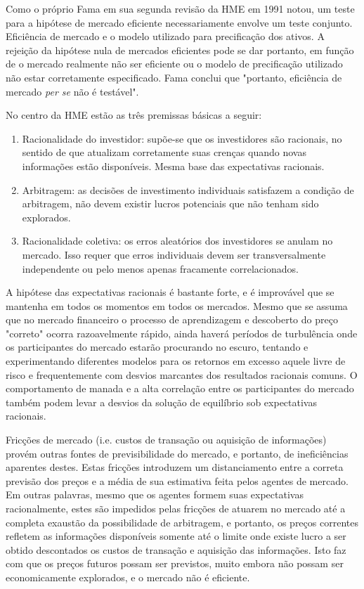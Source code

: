Como o próprio Fama em sua segunda revisão da HME em 1991 notou, um teste para a hipótese de mercado eficiente necessariamente envolve um teste conjunto. Eficiência de mercado e o modelo utilizado para precificação dos ativos. A rejeição da hipótese nula de mercados eficientes pode se dar portanto, em função de o mercado realmente não ser eficiente ou o modelo de precificação utilizado não estar corretamente especificado. Fama conclui que "portanto, eficiência de mercado \emph{per se} não é testável".

No centro da HME estão as três premissas básicas a seguir:

\begin{enumerate}
	\item Racionalidade do investidor: supõe-se que os investidores são racionais, no sentido de que atualizam corretamente suas crenças quando novas informações estão disponíveis. Mesma base das expectativas racionais.
	\item Arbitragem: as decisões de investimento individuais satisfazem a condição de arbitragem, não devem existir lucros potenciais que não tenham sido explorados.
	\item Racionalidade coletiva: os erros aleatórios dos investidores se anulam no mercado. Isso requer que erros individuais devem ser transversalmente independente ou pelo menos apenas fracamente correlacionados.
\end{enumerate}

A hipótese das expectativas racionais é bastante forte, e é improvável
que se mantenha em todos os momentos em todos os mercados. Mesmo que se assuma que no mercado financeiro o processo de aprendizagem e descoberto do preço "correto" ocorra razoavelmente rápido, ainda haverá períodos de turbulência onde os participantes do mercado estarão procurando no escuro, tentando e
experimentando diferentes modelos para os retornos em excesso aquele livre de risco e frequentemente com desvios marcantes
dos resultados racionais comuns. O comportamento de manada e a alta correlação entre os participantes do mercado também podem
levar a desvios da solução de equilíbrio sob expectativas racionais.

Fricções de mercado (i.e. custos de transação ou aquisição de informações) provém outras fontes de previsibilidade do mercado, e portanto, de ineficiências aparentes destes. Estas fricções introduzem um distanciamento entre a correta previsão dos preços e a média de sua estimativa feita pelos agentes de mercado. Em outras palavras, mesmo que os agentes formem suas expectativas racionalmente, estes são impedidos pelas fricções de atuarem no mercado até a completa exaustão da possibilidade de arbitragem, e portanto, os preços correntes refletem as informações disponíveis somente até o limite onde existe lucro a ser obtido descontados os custos de transação e aquisição das informações. Isto faz com que os preços futuros possam ser previstos, muito embora não possam ser economicamente explorados, e o mercado não é eficiente.
